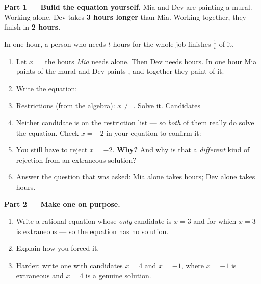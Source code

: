 \documentclass[10pt]{article}
\begin{document}
\begin{tcolorbox}[colback=white, colframe=black!40, title=\textbf{Tier E --- Extension},
    fonttitle=\bfseries, arc=1.5mm, left=3mm, right=3mm, top=2mm, bottom=2mm, breakable]
\textbf{Part 1 --- Build the equation yourself.} Mia and Dev are painting a mural. Working alone, Dev
takes \textbf{3 hours longer} than Mia. Working together, they finish in \textbf{2 hours}.

\vspace{2pt}
{\small In one hour, a person who needs $t$ hours for the whole job finishes $\frac{1}{t}$ of it.}
\begin{enumerate}[label=(\alph*), leftmargin=2.1em, itemsep=5pt]
  \item Let $x=$ the hours \emph{Mia} needs alone. Then Dev needs  hours. In one hour
        Mia paints  of the mural and Dev paints , and together they
        paint  of it.
  \item Write the equation: \; 
  \item Restrictions (from the algebra): $x\neq$ . \; Solve it. Candidates
  \item Neither candidate is on the restriction list --- so \emph{both} of them really do solve the
        equation. Check $x=-2$ in your equation to confirm it: 
  \item You still have to reject $x=-2$. \textbf{Why?} And why is that a \emph{different} kind of
        rejection from an extraneous solution? 
  \item Answer the question that was asked: Mia alone takes  hours; Dev alone takes
         hours.
\end{enumerate}

\vspace{5pt}
\textbf{Part 2 --- Make one on purpose.}
\begin{enumerate}[label=(\alph*), leftmargin=2.1em, itemsep=5pt]
  \item Write a rational equation whose \emph{only} candidate is $x=3$ and for which $x=3$ is
        extraneous --- so the equation has no solution. \;
  \item Explain how you forced it. 
  \item Harder: write one with candidates $x=4$ and $x=-1$, where $x=-1$ is extraneous and $x=4$ is a
        genuine solution. \; 
\end{enumerate}


\end{tcolorbox}
\end{document}
